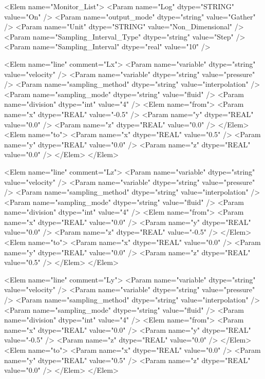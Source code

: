 {\small
\begin{program}
<Elem name="Monitor_List">
   <Param name="Log"                    dtype="STRING" value="On" />
   <Param name="output_mode"            dtype="string" value="Gather" />
   <Param name="Unit"                   dtype="STRING" value="Non_Dimensional" />
   <Param name="Sampling_Interval_Type" dtype="string" value="Step" />
   <Param name="Sampling_Interval"      dtype="real"   value="10" />
 
   <Elem name="line" comment="Lx">
     <Param name="variable"   dtype="string"   value="velocity" />
     <Param name="variable"   dtype="string"   value="pressure" />
     <Param name="sampling_method" dtype="string" value="interpolation" />
     <Param name="sampling_mode"   dtype="string" value="fluid" />
     <Param name="division"   dtype="int"   value="4" />
     <Elem name="from">
       <Param name="x"   dtype="REAL"   value="-0.5" />
       <Param name="y"   dtype="REAL"   value="0.0" />
       <Param name="z"   dtype="REAL"   value="0.0" />
     </Elem>
     <Elem name="to">
       <Param name="x"   dtype="REAL"   value="0.5" />
       <Param name="y"   dtype="REAL"   value="0.0" />
       <Param name="z"   dtype="REAL"   value="0.0" />
     </Elem>
   </Elem>
      
   <Elem name="line" comment="Lz">
     <Param name="variable"   dtype="string"   value="velocity" />
     <Param name="variable"   dtype="string"   value="pressure" />
     <Param name="sampling_method" dtype="string" value="interpolation" />
     <Param name="sampling_mode"   dtype="string" value="fluid" />
     <Param name="division"   dtype="int"   value="4" />
     <Elem name="from">
       <Param name="x"   dtype="REAL"   value="0.0" />
       <Param name="y"   dtype="REAL"   value="0.0" />
       <Param name="z"   dtype="REAL"   value="-0.5" />
     </Elem>
     <Elem name="to">
       <Param name="x"   dtype="REAL"   value="0.0" />
       <Param name="y"   dtype="REAL"   value="0.0" />
       <Param name="z"   dtype="REAL"   value="0.5" />
     </Elem>
   </Elem>

   <Elem name="line" comment="Ly">
     <Param name="variable"   dtype="string"   value="velocity" />
     <Param name="variable"   dtype="string"   value="pressure" />
     <Param name="sampling_method" dtype="string" value="interpolation" />
     <Param name="sampling_mode"   dtype="string" value="fluid" />
     <Param name="division"   dtype="int"   value="4" />
     <Elem name="from">
       <Param name="x"   dtype="REAL"   value="0.0" />
       <Param name="y"   dtype="REAL"   value="-0.5" />
       <Param name="z"   dtype="REAL"   value="0.0" />
     </Elem>
     <Elem name="to">
       <Param name="x"   dtype="REAL"   value="0.0" />
       <Param name="y"   dtype="REAL"   value="0.5" />
       <Param name="z"   dtype="REAL"   value="0.0" />
     </Elem>
   </Elem>


\end{program}}
